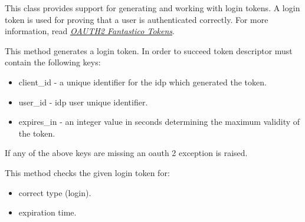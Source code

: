 \documentclass[letterpaper,10pt,english]{sphinxmanual}
\begin{document}
\begin{fulllineitems}
\label{features/oauth2/technical_summary:fantastico.oauth2.logintoken_generator.LoginTokenGenerator}
This class provides support for generating and working with login tokens. A login token is used for proving that a user
is authenticated correctly. For more information, read {\hyperref[features/oauth2/tokens_format::doc]{\emph{OAUTH2 Fantastico Tokens}}}.

\begin{fulllineitems}
\label{features/oauth2/technical_summary:fantastico.oauth2.logintoken_generator.LoginTokenGenerator.generate}
This method generates a login token. In order to succeed token descriptor must contain the following keys:
\begin{itemize}
\item {} 
client\_id - a unique identifier for the idp which generated the token.

\item {} 
user\_id - idp user unique identifier.

\item {} 
expires\_in - an integer value in seconds determining the maximum validity of the token.

\end{itemize}

If any of the above keys are missing an oauth 2 exception is raised.

\end{fulllineitems}


\begin{fulllineitems}
\label{features/oauth2/technical_summary:fantastico.oauth2.logintoken_generator.LoginTokenGenerator.validate}
This method checks the given login token for:
\begin{itemize}
\item {} 
correct type (login).

\item {} 
expiration time.

\end{itemize}

\end{fulllineitems}


\end{fulllineitems}
\end{document}
